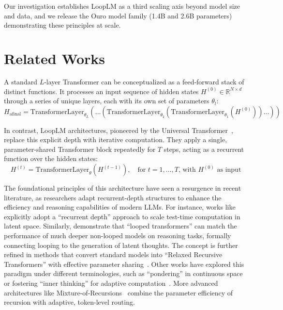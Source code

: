 \documentclass[]{bytedance_seed}
\newcommand{\R}{\mathbb{R}}
\newcommand{\1}{\mathbf{1}}
\newcommand{\ut}{LoopLM}
\begin{document}
Our investigation establishes \ut{} as a third scaling axis beyond model size and data, and we release the Ouro model family (1.4B and 2.6B parameters) demonstrating these principles at scale.

\section{Related Works}

 A standard $L$-layer Transformer can be conceptualized as a feed-forward stack of distinct functions. It processes an input sequence of hidden states $H^{(0)} \in \R^{N \times d}$ through a series of unique layers, each with its own set of parameters $\theta_l$:
$$H_{\text{afinal}} = \text{TransformerLayer}_{\theta_L}(\dots(\text{TransformerLayer}_{\theta_2}(\text{TransformerLayer}_{\theta_1}(H^{(0)}))\dots))$$

In contrast, \ut{} architectures, pioneered by the Universal Transformer~\cite{dehghani2018universal}, replace this explicit depth with iterative computation. They apply a single, parameter-shared Transformer block repeatedly for $T$ steps, acting as a recurrent function over the hidden states:
$$H^{(t)} = \text{TransformerLayer}_{\theta}(H^{(t-1)}), \quad \text{for } t=1, \dots, T \text{, with } H^{(0)} \text{ as input}$$

The foundational principles of this architecture have seen a resurgence in recent literature, as researchers adapt recurrent-depth structures to enhance the efficiency and reasoning capabilities of modern LLMs. For instance, works like \cite{geiping2025scaling} explicitly adopt a ``recurrent depth'' approach to scale test-time computation in latent space. Similarly, \cite{saunshi2025reasoning} demonstrate that ``looped transformers'' can match the performance of much deeper non-looped models on reasoning tasks, formally connecting looping to the generation of latent thoughts. The concept is further refined in methods that convert standard models into ``Relaxed Recursive Transformers'' with effective parameter sharing~\cite{bae2024relaxed}. Other works have explored this paradigm under different terminologies, such as ``pondering'' in continuous space~\cite{zeng2025pretraining} or fostering ``inner thinking'' for adaptive computation~\cite{chen2025inner}. More advanced architectures like Mixture-of-Recursions~\cite{bae2025mixture} combine the parameter efficiency of recursion with adaptive, token-level routing.
\end{document}
